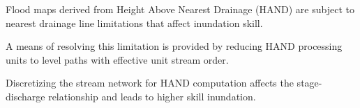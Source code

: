 

%
\begin{keypoints}
\item Flood maps derived from Height Above Nearest Drainage (HAND) are subject to nearest drainage line limitations that affect inundation skill.
\item A means of resolving this limitation is provided by reducing HAND processing units to level paths with effective unit stream order.
\item Discretizing the stream network for HAND computation affects the stage-discharge relationship and leads to higher skill inundation.
\end{keypoints}
%
